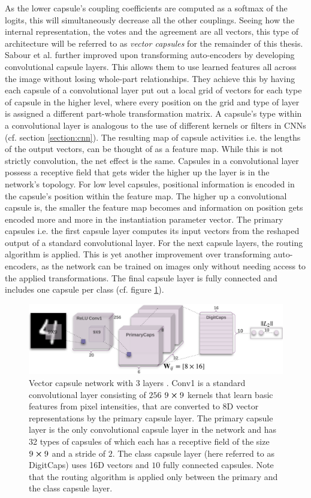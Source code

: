 \noindent
As the lower capsule's coupling coefficients are computed as a softmax of the logits, this will simultaneously decrease all the other couplings. Seeing how the internal representation, the votes and the agreement are all vectors, this type of architecture will be referred to as \emph{vector capsules} for the remainder of this thesis. Sabour et al. further improved upon transforming auto-encoders by developing convolutional capsule layers. This allows them to use learned features all across the image without losing whole-part relationships. They achieve this by having each capsule of a convolutional layer put out a local grid of vectors for each type of capsule in the higher level, where every position on the grid and type of layer is assigned a different part-whole transformation matrix. A capsule's type within a convolutional layer is analogous to the use of different kernels or filters in CNNs (cf. section \ref{section:cnn}). The resulting map of capsule activities i.e. the lengths of the output vectors, can be thought of as a feature map. While this is not strictly convolution, the net effect is the same. Capsules in a convolutional layer possess a receptive field that gets wider the higher up the layer is in the network's topology. For low level capsules, positional information is encoded in the capsule's position within the feature map. The higher up a convolutional capsule is, the smaller the feature map becomes and information on position gets encoded more and more in the instantiation parameter vector.
The primary capsules i.e. the first capsule layer computes its input vectors from the reshaped output of a standard convolutional layer. For the next capsule layers, the routing algorithm is applied. This is yet another improvement over transforming auto-encoders, as the network can be trained on images only without needing access to the applied transformations. The final capsule layer is fully connected and includes one capsule per class (cf. figure \ref{fig:vector-capsules}).
\begin{figure}[H]
    \centering
    \includegraphics[width=\textwidth]{figures/vector-capsules.png}
\caption[Vector capsule network with 3 layers]{Vector capsule network with 3 layers \cite{sabour2017dynamic}. Conv1 is a standard convolutional layer consisting of $\num{256}$ $9\cross9$ kernels that learn basic features from pixel intensities, that are converted to 8D vector representations by the primary capsule layer. The primary capsule layer is the only convolutional capsule layer in the network and has 32 types of capsules of which each has a receptive field of the size $9\cross9$ and a stride of $\num{2}$. The class capsule layer (here referred to as DigitCaps) uses 16D vectors and $\num{10}$ fully connected capsules. Note that the routing algorithm is applied only between the primary and the class capsule layer.}\label{fig:vector-capsules}
\end{figure}\noindent
